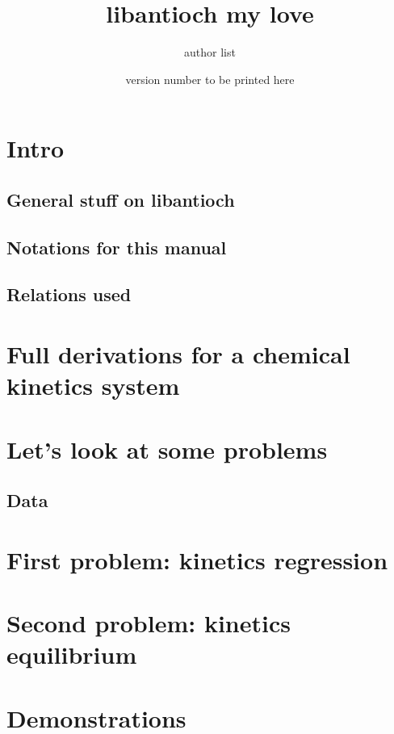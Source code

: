 \documentclass{article}
\begin{document}
\title{libantioch my love}
\date{version number to be printed here}
\author{author list}

\maketitle
\tableofcontents

\section{Intro}

\subsection{General stuff on libantioch}


\subsection{Notations for this manual}


\subsection{Relations used}
\label{relations}


\section{Full derivations for a chemical kinetics system}
\label{derivations}


\section{Let's look at some problems}
\subsection{Data}


\section{First problem: kinetics regression}


\section{Second problem: kinetics equilibrium}


\appendix
\section{Demonstrations}
\label{demo}

\end{document}
